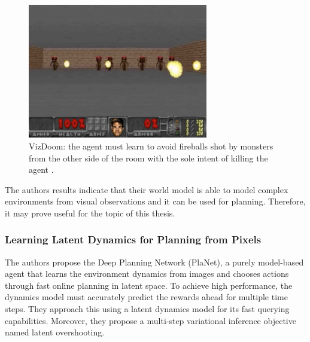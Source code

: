 \begin{figure}[H]
\includegraphics[width=0.7\textwidth,keepaspectratio]{figures/VizDoom.png}
\caption[VizDoom]{VizDoom: the agent must learn to avoid fireballs shot by monsters from the other side of the room with the sole intent of killing the agent \protect\cite{Algo.WorldModels}.}
\label{Fig.VizDoom}
\end{figure}

The authors results indicate that their world model is able to model complex environments from visual observations and it can be used for planning. Therefore, it may prove useful for the topic of this thesis.

\subsubsection{Learning Latent Dynamics for Planning from Pixels}

The authors propose the Deep Planning Network \cite{Algo.PlaNet} (PlaNet), a purely model-based agent that learns the environment dynamics from images and chooses actions through fast online planning in latent space. To achieve high performance, the dynamics model must accurately predict the rewards ahead for multiple time steps. They approach this using a latent dynamics model for its fast querying capabilities. Moreover, they propose a multi-step variational inference objective named latent overshooting.

